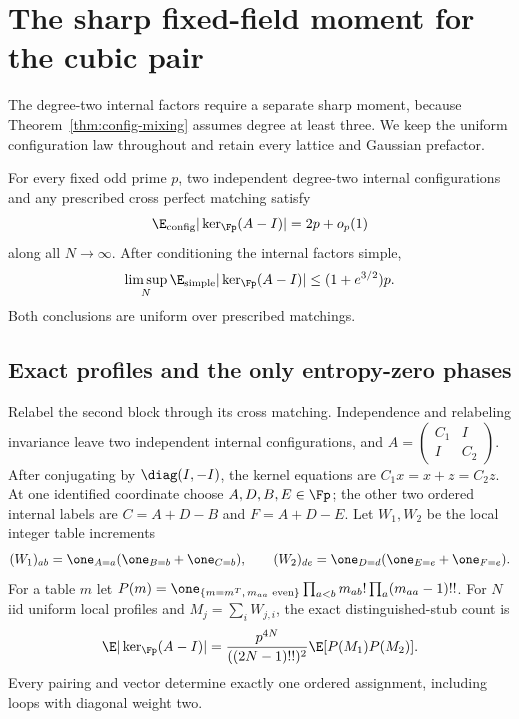 \section{The sharp fixed-field moment for the cubic pair}\label{app:cubic-sharp}
The degree-two internal factors require a separate sharp moment,
because Theorem~\ref{thm:config-mixing} assumes degree at least three.
We keep the uniform configuration law throughout and retain every
lattice and Gaussian prefactor.

\begin{theorem}\label{thm:cubic-raw}
For every fixed odd prime $p$, two independent degree-two internal
configurations and any prescribed cross perfect matching satisfy
\begin{equation}\label{eq:cubic-raw}
 \E_{\rm config}|\ker_{\Fp}(A-I)|=2p+o_p(1)
\end{equation}
along all $N\to\infty$. After conditioning the internal factors
simple,
\[
 \limsup_N\E_{\rm simple}|\ker_{\Fp}(A-I)|
 \le(1+e^{3/2})p.
\]
Both conclusions are uniform over prescribed matchings.
\end{theorem}

\subsection{Exact profiles and the only entropy-zero phases}
Relabel the second block through its cross matching. Independence
and relabeling invariance leave two independent internal configurations,
and $A=\left(\begin{smallmatrix}C_1&I\\I&C_2\end{smallmatrix}\right)$.
After conjugating by $\diag(I,-I)$, the kernel equations are
$C_1x=x+z=C_2z$. At one identified coordinate choose
$A,D,B,E\in\Fp$; the other two ordered internal labels are
$C=A+D-B$ and $F=A+D-E$.
Let $W_1,W_2$ be the local integer table increments
\[
 (W_1)_{ab}=\one_{A=a}(\one_{B=b}+\one_{C=b}),\qquad
 (W_2)_{de}=\one_{D=d}(\one_{E=e}+\one_{F=e}).
\]
For a table $m$ let
$P(m)=\one_{\{m=m^T,\,m_{aa}\text{ even}\}}
\prod_{a<b}m_{ab}!\prod_a(m_{aa}-1)!!$.
For $N$ iid uniform local profiles and $M_j=\sum_iW_{j,i}$,
the exact distinguished-stub count is
\begin{equation}\label{eq:cubic-iid}
 \E|\ker_{\Fp}(A-I)|
 =\frac{p^{4N}}{((2N-1)!!)^2}\E[P(M_1)P(M_2)].
\end{equation}
Every pairing and vector determine exactly one ordered assignment,
including loops with diagonal weight two.


